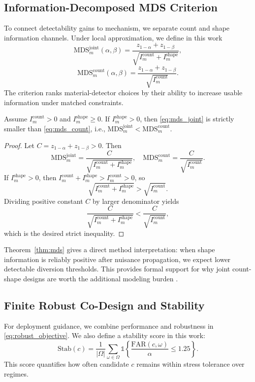 \subsection{Information-Decomposed MDS Criterion}
To connect detectability gains to mechanism, we separate count and shape information channels. Under local approximation, we define in this work
\begin{equation}
\mathrm{MDS}^{\mathrm{joint}}_m(\alpha,\beta)=\frac{z_{1-\alpha}+z_{1-\beta}}{\sqrt{I_m^{\mathrm{count}}+I_m^{\mathrm{shape}}}},
\label{eq:mds_joint}
\end{equation}
\begin{equation}
\mathrm{MDS}^{\mathrm{count}}_m(\alpha,\beta)=\frac{z_{1-\alpha}+z_{1-\beta}}{\sqrt{I_m^{\mathrm{count}}}}.
\label{eq:mds_count}
\end{equation}
The criterion ranks material-detector choices by their ability to increase usable information under matched constraints.

\begin{theorem}\label{thm:mds}
Assume $I_m^{\mathrm{count}}>0$ and $I_m^{\mathrm{shape}}\ge 0$. If $I_m^{\mathrm{shape}}>0$, then \eqref{eq:mds_joint} is strictly smaller than \eqref{eq:mds_count}, i.e., $\mathrm{MDS}^{\mathrm{joint}}_m<\mathrm{MDS}^{\mathrm{count}}_m$.
\end{theorem}
\begin{proof}
Let $C=z_{1-\alpha}+z_{1-\beta}>0$. Then
\[
\mathrm{MDS}^{\mathrm{joint}}_m = \frac{C}{\sqrt{I_m^{\mathrm{count}}+I_m^{\mathrm{shape}}}},\quad
\mathrm{MDS}^{\mathrm{count}}_m = \frac{C}{\sqrt{I_m^{\mathrm{count}}}}.
\]
If $I_m^{\mathrm{shape}}>0$, then $I_m^{\mathrm{count}}+I_m^{\mathrm{shape}}>I_m^{\mathrm{count}}>0$, so
\[
\sqrt{I_m^{\mathrm{count}}+I_m^{\mathrm{shape}}}>\sqrt{I_m^{\mathrm{count}}}.
\]
Dividing positive constant $C$ by larger denominator yields
\[
\frac{C}{\sqrt{I_m^{\mathrm{count}}+I_m^{\mathrm{shape}}}} < \frac{C}{\sqrt{I_m^{\mathrm{count}}}},
\]
which is the desired strict inequality.
\end{proof}

Theorem~\ref{thm:mds} gives a direct method interpretation: when shape information is reliably positive after nuisance propagation, we expect lower detectable diversion thresholds. This provides formal support for why joint count-shape designs are worth the additional modeling burden \citep{SRC014,SRC023,SRC030}.

\subsection{Finite Robust Co-Design and Stability}
For deployment guidance, we combine performance and robustness in \eqref{eq:robust_objective}. We also define a stability score in this work:
\begin{equation}
\mathrm{Stab}(c)=\frac{1}{|\Omega|}\sum_{\omega\in\Omega}\mathbb{1}\left\{\frac{\mathrm{FAR}(c,\omega)}{\alpha}\le 1.25\right\}.
\label{eq:stability_score}
\end{equation}
This score quantifies how often candidate $c$ remains within stress tolerance over regimes.

